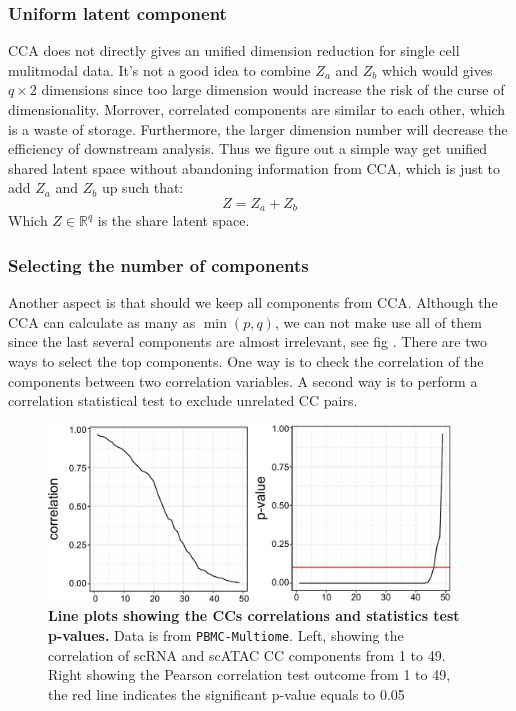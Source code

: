\subsubsection{Uniform latent component}
CCA does not directly gives an unified dimension reduction for single cell mulitmodal data. It's not a good idea to combine $Z_a$ and $Z_b$ which would gives $q\times 2$ dimensions since too large dimension would increase the risk of the curse of dimensionality. Morrover, correlated components are similar to each other, which is a waste of storage. Furthermore, the larger dimension number will decrease the efficiency of downstream analysis. Thus we figure out a simple way get unified shared latent space without abandoning information from CCA, which is just to add $Z_a$ and $Z_b$ up such that:
\begin{equation}
    Z = Z_a + Z_b
\end{equation}
Which $Z\in \mathbb{R}^{q}$ is the share latent space. 

\subsubsection{Selecting the number of components}
Another aspect is that should we keep all components from CCA. Although the CCA can calculate as many as $\min(p, q)$, we can not make use all of them since the last several components are almost irrelevant, see fig . There are two ways to select the top components. One way is to check the correlation of the components between two correlation variables. A second way is to perform a correlation statistical test to exclude unrelated CC pairs. 

\begin{figure}[!ht]
	\centering
	\includegraphics[width=0.95\textwidth]{CC_pval_select/fig}
	\vspace{0.1cm}
	\caption[Line plots showing the CCs correlations and statistics test p-values.]{\textbf{Line plots showing the CCs correlations and statistics test p-values.} Data is from \texttt{PBMC-Multiome}. Left, showing the correlation of scRNA and scATAC CC components from 1 to 49. Right showing the Pearson correlation test outcome from 1 to 49, the red line indicates the significant p-value equals to 0.05}
	\label{fig:CC_pval_select}
\end{figure}


